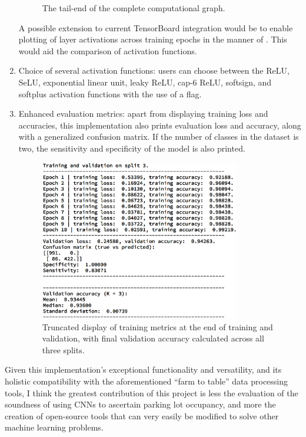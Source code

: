 \documentclass[a4paper, 11pt]{article} %
\begin{document}
\begin{enumerate}
\begin{figure}[H]
				\caption{The tail-end of the complete computational graph.}
			\end{figure}
			A possible extension to current TensorBoard integration would be to 
			enable plotting of layer activations across training epochs in the 
			manner of \cite{github-activations}. This would aid the comparison 
			of activation functions.
			\item Choice of several activation functions: users can choose 
			between the ReLU, SeLU, exponential linear unit, leaky ReLU, cap-6 
			ReLU, softsign, and softplus activation functions with the use of a 
			flag.
			\item Enhanced evaluation metrics: apart from displaying training 
			loss and accuracies, this implementation also prints evaluation 
			loss and accuracy, along with a generalized confusion matrix. If 
			the number of classes in the dataset is two, the sensitivity and 
			specificity of the model is also printed.
			\begin{figure}[H]
				\centering
				\includegraphics[height=7cm]{figures/floydhub_results_example}
				\caption{Truncated display of training metrics at the end of 
				training and validation, with final validation accuracy 
				calculated across all three splits.}
			\end{figure}
		\end{enumerate}
		Given this implementation's exceptional functionality and versatility, 
		and its holistic compatibility with the aforementioned ``farm to 
		table'' data processing tools, I think the greatest contribution of 
		this project is less the evaluation of the soundness of using CNNs to 
		ascertain parking lot occupancy, and more the creation of open-source 
		tools that can very easily be modified to solve other machine learning 
		problems.
\end{document}
